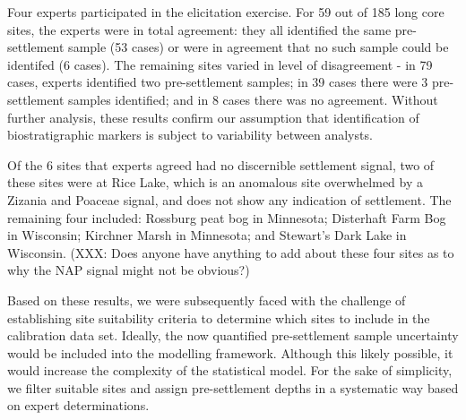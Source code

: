 \documentclass[12pt]{article}
\begin{document}
Four experts participated in the elicitation exercise. For 59 out of
185 long core sites, the experts were in total agreement: they all
identified the same pre-settlement sample (53 cases) or were in
agreement that no such sample could be identifed (6 cases). The
remaining sites varied in level of disagreement - in 79 cases, experts
identified two pre-settlement samples; in 39 cases there were 3
pre-settlement samples identified; and in 8 cases there was no
agreement. Without further analysis, these results confirm our
assumption that identification of biostratigraphic markers is subject
to variability between analysts.

Of the 6 sites that experts agreed had no discernible settlement
signal, two of these sites were at Rice Lake, which is an anomalous
site overwhelmed by a Zizania and Poaceae signal, and does not show
any indication of settlement. The remaining four included: Rossburg
peat bog in Minnesota; Disterhaft Farm Bog in Wisconsin; Kirchner
Marsh in Minnesota; and Stewart's Dark Lake in Wisconsin. (XXX: Does
anyone have anything to add about these four sites as to why the NAP
signal might not be obvious?)

Based on these results, we were subsequently faced with the challenge
of establishing site suitability criteria to determine which sites to
include in the calibration data set. Ideally, the now quantified
pre-settlement sample uncertainty would be included into the modelling
framework. Although this likely possible, it would increase the
complexity of the statistical model. For the sake of simplicity, we
filter suitable sites and assign pre-settlement depths in a systematic
way based on expert determinations.

\end{document}
